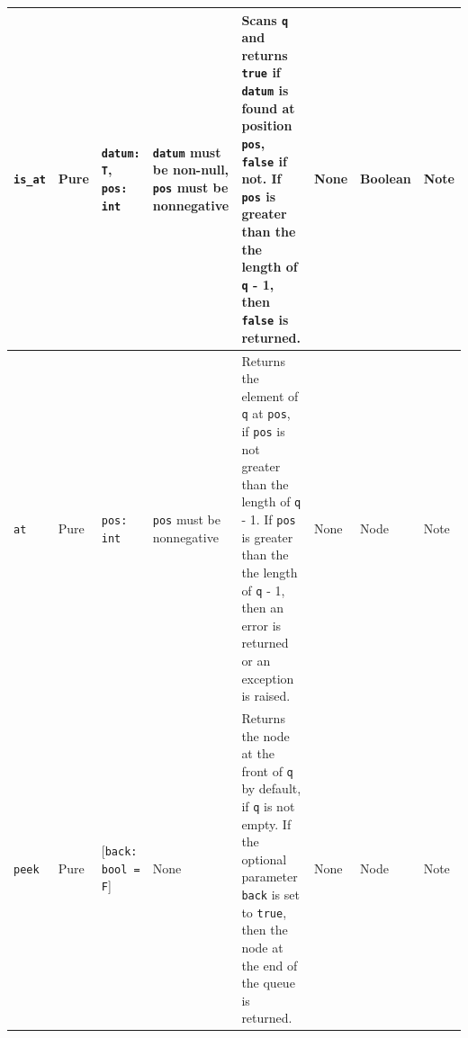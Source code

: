 \documentclass[10pt,letterpaper,final]{report}
\begin{document}
{\begin{center}
\begin{landscape}
\begin{xltabular}{\linewidth}{|l|l|X|X|X|X|X|X|}
          \verb|is_at|     & Pure   & \verb|datum: T|, \verb|pos: int|  & \verb|datum| must be non-null, \verb|pos| must be nonnegative & Scans \verb|q| and returns \verb|true| if \verb|datum| is found at position \verb|pos|, \verb|false| if not. If \verb|pos| is greater than the the length of \verb|q| - 1, then \verb|false| is returned.                                                                                                                     & None                                                                                                                                                         & Boolean  & Note                                                                                                                                                            \\ \hline
          \verb|at|        & Pure   & \verb|pos: int|                   & \verb|pos| must be nonnegative                                & Returns the element of \verb|q| at \verb|pos|, if \verb|pos| is not greater than the length of \verb|q| - 1. If \verb|pos| is greater than the the length of \verb|q| - 1, then an error is returned or an exception is raised.                                                                                               & None                                                                                                                                                         & Node     & Note                                                                                                                                                            \\ \hline
          \verb|peek|      & Pure   & [\verb|back:| \verb|bool = F|]    & None                                                          & Returns the node at the front of \verb|q| by default, if \verb|q| is not empty. If the optional parameter \verb|back| is set to \verb|true|, then the node at the end of the queue is returned.                                                                                                                               & None                                                                                                                                                         & Node     & Note                                                                                                                                                            \\ \hline

\end{xltabular}
\end{landscape}
\end{center}}
\end{document}
